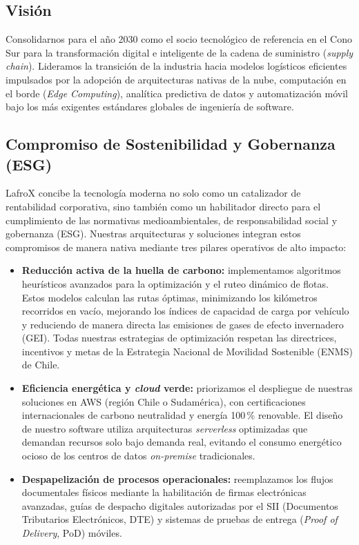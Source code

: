 \subsection{Visión}

Consolidarnos para el año 2030 como el socio tecnológico de referencia en el Cono Sur
para la transformación digital e inteligente de la cadena de suministro
(\emph{supply chain}). Lideramos la transición de la industria hacia modelos logísticos
eficientes impulsados por la adopción de arquitecturas nativas de la nube, computación en
el borde (\emph{Edge Computing}), analítica predictiva de datos y automatización móvil
bajo los más exigentes estándares globales de ingeniería de software.

\subsection{Compromiso de Sostenibilidad y Gobernanza (ESG)}

LafroX concibe la tecnología moderna no solo como un catalizador de rentabilidad
corporativa, sino también como un habilitador directo para el cumplimiento de las
normativas medioambientales, de responsabilidad social y gobernanza (ESG). Nuestras
arquitecturas y soluciones integran estos compromisos de manera nativa mediante tres
pilares operativos de alto impacto:

\begin{itemize}
  \item \textbf{Reducción activa de la huella de carbono:} implementamos algoritmos
        heurísticos avanzados para la optimización y el ruteo dinámico de flotas. Estos
        modelos calculan las rutas óptimas, minimizando los kilómetros recorridos en
        vacío, mejorando los índices de capacidad de carga por vehículo y reduciendo de
        manera directa las emisiones de gases de efecto invernadero (GEI). Todas nuestras
        estrategias de optimización respetan las directrices, incentivos y metas de la
        Estrategia Nacional de Movilidad Sostenible (ENMS) de Chile.
  \item \textbf{Eficiencia energética y \emph{cloud} verde:} priorizamos el despliegue
        de nuestras soluciones en AWS (región Chile o Sudamérica), con
        certificaciones internacionales de carbono neutralidad y energía 100\,\%
        renovable. El diseño de nuestro software utiliza arquitecturas \emph{serverless}
        optimizadas que demandan recursos solo bajo demanda real, evitando el consumo
        energético ocioso de los centros de datos \emph{on-premise} tradicionales.
  \item \textbf{Despapelización de procesos operacionales:} reemplazamos los flujos
        documentales físicos mediante la habilitación de firmas electrónicas avanzadas,
        guías de despacho digitales autorizadas por el SII (Documentos Tributarios
        Electrónicos, DTE) y sistemas de pruebas de entrega (\emph{Proof of Delivery},
        PoD) móviles.
\end{itemize}

